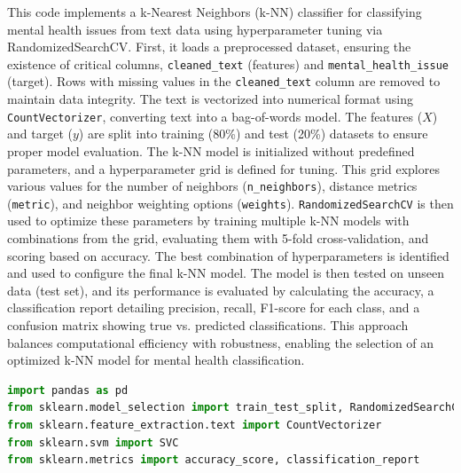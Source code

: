 \noindent
This code implements a k-Nearest Neighbors (k-NN) classifier for classifying mental health issues from text data using hyperparameter tuning via RandomizedSearchCV. First, it loads a preprocessed dataset, ensuring the existence of critical columns, \texttt{cleaned\_text} (features) and \texttt{mental\_health\_issue} (target). Rows with missing values in the \texttt{cleaned\_text} column are removed to maintain data integrity. The text is vectorized into numerical format using \texttt{CountVectorizer}, converting text into a bag-of-words model. The features (\(X\)) and target (\(y\)) are split into training (80\%) and test (20\%) datasets to ensure proper model evaluation. The k-NN model is initialized without predefined parameters, and a hyperparameter grid is defined for tuning. This grid explores various values for the number of neighbors (\texttt{n\_neighbors}), distance metrics (\texttt{metric}), and neighbor weighting options (\texttt{weights}). \texttt{RandomizedSearchCV} is then used to optimize these parameters by training multiple k-NN models with combinations from the grid, evaluating them with 5-fold cross-validation, and scoring based on accuracy. The best combination of hyperparameters is identified and used to configure the final k-NN model. The model is then tested on unseen data (test set), and its performance is evaluated by calculating the accuracy, a classification report detailing precision, recall, F1-score for each class, and a confusion matrix showing true vs. predicted classifications. This approach balances computational efficiency with robustness, enabling the selection of an optimized k-NN model for mental health classification.


\begin{tcolorbox}[colback=gray!5!white, colframe=gray!80!black, boxrule=0.5pt, title=Support Vector Machine]
    \begin{lstlisting}[language=Python]
import pandas as pd
from sklearn.model_selection import train_test_split, RandomizedSearchCV
from sklearn.feature_extraction.text import CountVectorizer
from sklearn.svm import SVC
from sklearn.metrics import accuracy_score, classification_report
\end{lstlisting}
\end{tcolorbox}


